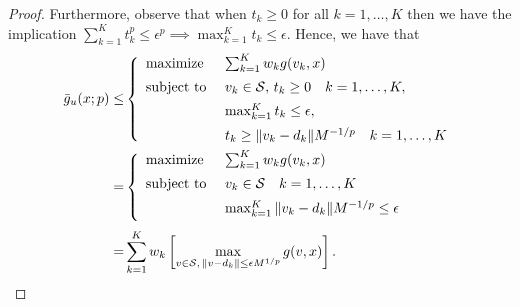 \documentclass[12pt]{article}
\theoremstyle{thmstyleone}%
\theoremstyle{thmstyletwo}%
\theoremstyle{thmstylethree}%
\begin{document}
\begin{appendices}
\begin{proof}
  Furthermore, observe that when $t_k\geq 0$ for all $k=1,\dots, K$ then we have the implication $\sum_{k=1}^K t^p_k\leq \epsilon^p \implies \max_{k=1}^K t_k \leq \epsilon$. Hence, we have that
  \begin{align*}
    \bar{g}_u(x; p)
    \leq &
    \left\{
      \begin{array}{l@{~~~~}l}
				\mbox{maximize} & \sum_{k=1}^K w_k g(v_k, x) \\[0.5em]
        \mbox{subject to} & v_k\in \supp, \, t_k\geq 0 \quad k = 1,\dots,K,\\[0.5em]
             &  \max_{k=1}^K t_k \leq \epsilon,\\[0.5em]
             &  t_k\geq \norm{v_k-d_k} M^{-1/p} \quad k = 1,\dots,K
      \end{array}
           \right.\\
    = &    \left\{
      \begin{array}{l@{~~~~}l}
				\mbox{maximize} & \sum_{k=1}^K w_k g(v_k, x) \\[0.5em]
        \mbox{subject to} & v_k\in \supp\quad k = 1,\dots,K\\[0.5em]
             &  \max_{k=1}^K \norm{v_k-d_k} M^{-1/p} \leq \epsilon\\[0.5em]
      \end{array}
        \right.\\
    = &  \sum_{k=1}^K w_k \left[\max_{v\in \supp,\,\norm{v-d_k}\leq \epsilon M^{1/p}} g(v, x)\right].
  \end{align*}


\end{proof}
\end{appendices}
\end{document}
